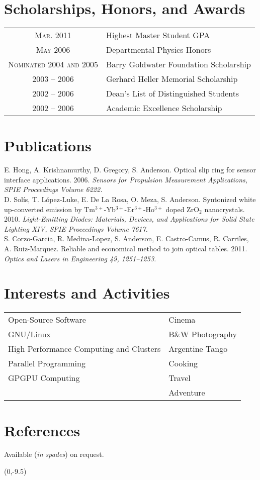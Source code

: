 \documentclass[letterpaper,10pt]{article}
\begin{document}
\section{Scholarships, Honors, and Awards}
	\begin{tabular}{cl}
		\textsc{Mar. 2011}					&	Highest Master Student GPA\\
		\textsc{May 2006}					&	Departmental Physics Honors\\
		\textsc{Nominated 2004 and 2005}	&	Barry Goldwater Foundation Scholarship\\
		2003 -- 2006						&	Gerhard Heller Memorial Scholarship\\
		2002 -- 2006						&	Dean's List of Distinguished Students\\
		2002 -- 2006						&	Academic Excellence Scholarship
	\end{tabular}

\section{Publications}
	E. Hong, A. Krishnamurthy, D. Gregory, S. Anderson. Optical slip ring for sensor interface applications. 2006. \emph{Sensors for Propulsion Measurement Applications, SPIE Proceedings Volume 6222.}\\[5pt]
	D. Solís, T. López-Luke, E. De La Rosa, O. Meza, S. Anderson. Syntonized white up-converted emission by Tm$^{3+}$-Yb$^{3+}$-Er$^{3+}$-Ho$^{3+}$ doped ZrO$_{2}$ nanocrystals. 2010. \emph{Light-Emitting Diodes: Materials, Devices, and Applications for Solid State Lighting XIV, SPIE Proceedings Volume 7617.}\\[5pt]
	S. Corzo-Garcia, R. Medina-Lopez, S. Anderson, E. Castro-Camus, R. Carriles, A. Ruiz-Marquez. Reliable and economical method to join optical tables. 2011. \emph{Optics and Lasers in Engineering 49, 1251–1253.}

\section{Interests and Activities}
	\begin{tabular}{l|l}
		Open-Source Software						&	Cinema\\
		GNU/Linux									&	B\&W Photography\\
		High Performance Computing and Clusters		&	Argentine Tango\\
		Parallel Programming						&	Cooking\\
		GPGPU Computing								&	Travel\\
													&	Adventure
	\end{tabular}

\section{References}
Available (\emph{in spades}) on request.

\begin{textblock}{1}(0,-9.5)
\end{textblock}
\end{document}

